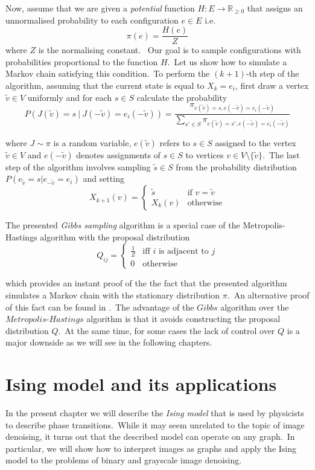 \documentclass[shortabstract, english, lic]{iithesis}
\newcommand\numberedchapter[1]{\setlength\topskip{3cm}\chapter{#1}\setlength\topskip{0cm}}
\theoremstyle{default_theorem_style}\newtheorem{theorem}{Theorem}
\theoremstyle{default_theorem_style}\newtheorem{definition}{Definition}
\begin{document}
\noindent Now, assume that we are given a \textit{potential} function $H : E \to \mathbb R_{\geq 0}$ that assigns an
unnormalised probability to each configuration $e \in E$ i.e.\
$$
\pi(e) = \frac{H(e)}{Z}
$$
where $Z$ is the normalising constant. \ Our goal is to sample configurations with probabilities proportional
to the function $H$.\ Let us show how to simulate a Markov chain satisfying this condition.\ To
perform the $(k + 1)$-th step of the algorithm, assuming that the current state is equal to
$X_k = e_i$, first draw a vertex $\tilde{v} \in V$ uniformly and for each $s \in S$ calculate the probability
$$
P(J(\tilde{v}) = s\ |\ J(-\tilde{v})=e_i(-\tilde{v})) = \frac{\pi_{e(\tilde{v}) =
s,e(-\tilde{v}) = e_i(-\tilde{v})}}{\sum_{s' \in S} \pi_{e(\tilde{v}) = s', e(-\tilde{v}) = e_i(-\tilde{v})}}
$$

where $J \sim \pi$ is a random variable, $e(\tilde{v})$ refers to $s \in S$ assigned to the vertex $\tilde{v} \in V$ and
$e(-\tilde{v})$ denotes assignments of $s \in S$ to vertices $v \in V \setminus \{\tilde{v}\}$.\ The last step of
the algorithm involves sampling $\tilde{s} \in S$ from the probability distribution
$P(e_{\tilde{v}} = s | e_{-\tilde{v}} = e_i)$ and setting
$$
X_{k + 1}(v) =
\begin{cases}
  \tilde{s} &\text{if $v = \tilde{v}$}\\
  X_k(v) &\text{otherwise}
\end{cases}
$$

\noindent The presented \textit{Gibbs sampling} algorithm is a special case of the Metropolis-Hastings algorithm
with the proposal distribution
$$
Q_{ij} =
\begin{cases}
  \frac{1}{Z} &\text{iff $i$ is adjacent to $j$}\\
  0 &\text{otherwise}
\end{cases}
$$

\noindent which provides an instant proof of the the fact that the presented algorithm simulates a Markov chain with the
stationary distribution $\pi$.\ An alternative proof of this fact can be found in \cite{mcmc_book}.\ The advantage of
the $Gibbs$ algorithm over the $Metropolis$-$Hastings$ algorithm is that it avoids constructing  the proposal
distribution $Q$.\ At the same time, for some cases the lack of control over $Q$ is a major downside as we will see
in the following chapters.

\numberedchapter{Ising model and its applications}\label{chapter:ising_model}

\noindent In the present chapter we will describe the \textit{Ising model} that is used by physicists to describe phase
transitions.\ While it may seem unrelated to the topic of image denoising, it turns out that the described model
can operate on any graph.\ In particular, we will show how to interpret images as graphs and apply the Ising model to
the problems of binary and grayscale image denoising.
\end{document}
